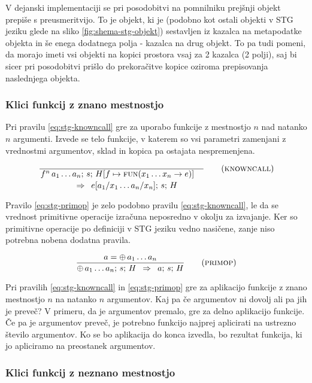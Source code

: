 V dejanski implementaciji se pri posodobitvi na pomnilniku prejšnji ob\-je\-kt prepiše s preusmeritvijo. To je objekt, ki je (podobno kot ostali objekti v STG jeziku glede na sliko \ref{fig:shema-stg-objekt}) sestavljen iz kazalca na metapodatke objekta in še enega dodatnega polja - kazalca na drug objekt. To pa tudi pomeni, da morajo imeti vsi objekti na kopici prostora vsaj za 2 kazalca (2 polji), saj bi sicer pri posodobitvi prišlo do prekoračitve kopice oziroma prepisovanja naslednjega objekta.

\subsubsection{Klici funkcij z znano mestnostjo}

Pri pravilu \ref{eq:stg-knowncall} gre za uporabo funkcije z mestnostjo $n$ nad natanko $n$ argumenti. Izvede se telo funkcije, v katerem so vsi parametri zamenjani z vrednostmi argumentov, sklad in kopica pa ostajata nespremenjena.

\begin{equation}
	\linfer[knowncall]{}{
		f^n \, a_1 \dots a_n; \, s; \, H[f \mapsto \textsc{fun}(x_1 \dots x_n \to e)]
	}{
		e[a_1 / x_1 \dots a_n / x_n]; \, s; \, H
	}
\label{eq:stg-knowncall}
\end{equation}

Pravilo \ref{eq:stg-primop} je zelo podobno pravilu \ref{eq:stg-knowncall}, le da se vrednost primitivne operacije izračuna neposredno v okolju za izvajanje. Ker so primitivne operacije po definiciji v STG jeziku vedno nasičene, zanje niso potrebna nobena dodatna pravila.

\begin{equation}
	\infer[primop]{
		a = \oplus \, a_1 \dots a_n
	}{
		\oplus \, a_1 \dots a_n; \, s; \, H
	}{
		a; \, s; \, H
	}
\label{eq:stg-primop}
\end{equation}

Pri pravilih \ref{eq:stg-knowncall} in \ref{eq:stg-primop} gre za aplikacijo funkcije z znano mestnostjo $n$ na natanko $n$ argumentov. Kaj pa če argumentov ni dovolj ali pa jih je preveč? V primeru, da je argumentov premalo, gre za delno aplikacijo funkcije. Če pa je argumentov preveč, je potrebno funkcijo najprej aplicirati na ustrezno število argumentov. Ko se bo aplikacija do konca izvedla, bo rezultat funkcija, ki jo apliciramo na preostanek argumentov.

\subsubsection{Klici funkcij z neznano mestnostjo}

